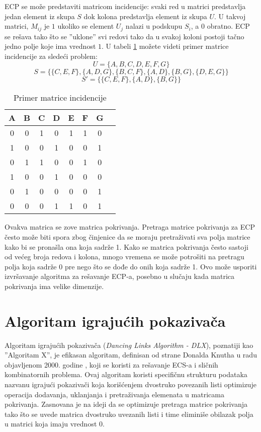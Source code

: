 \documentclass[a4paper]{article}
\begin{document}
{ECP se može predstaviti matricom incidencije: svaki red u matrici predstavlja jedan element iz skupa
\( S \) dok kolona predstavlja element iz skupa \( U \). U takvoj matrici, \( M_{ij} \) je \( 1 \)
ukoliko se element \( U_{j} \) nalazi u podskupu \( S_{i} \), a \( 0 \) obratno. ECP se rešava tako
što se ''uklone'' svi redovi tako da u svakoj koloni postoji tačno jedno polje koje ima vrednost \( 1 \).
U tabeli \ref{tab:incidencije} možete videti primer matrice incidencije za sledeći problem:\\
$$U = \{A, B, C, D, E, F, G\}$$
$$S = \{\{C, E, F\}, \{A, D, G\}, \{B, C, F\}, \{A, D\}, \{B, G\}, \{D, E, G\}\}$$
$$S' = \{\{C, E, F\}, \{A, D\}, \{B, G\}\}$$
\begin{table}[htbp]
  \centering
  \caption{Primer matrice incidencije}
  \label{tab:incidencije}
  \begin{tabular}{|c|*{7}{c|}}
    \hline
    A & B & C & D & E & F & G \\
    \hline
    \rowcolor{green} 0 & 0 & 1 & 0 & 1 & 1 & 0 \\
    1 & 0 & 0 & 1 & 0 & 0 & 1 \\
    0 & 1 & 1 & 0 & 0 & 1 & 0 \\
    \rowcolor{green} 1 & 0 & 0 & 1 & 0 & 0 & 0 \\
    \rowcolor{green} 0 & 1 & 0 & 0 & 0 & 0 & 1 \\
    0 & 0 & 0 & 1 & 1 & 0 & 1 \\
    \hline
  \end{tabular}
\end{table}

Ovakva matrica se zove matrica pokrivanja. Pretraga matrice pokrivanja za ECP često može biti spora zbog
činjenice da se moraju pretraživati sva polja matrice kako bi se pronašla ona koja sadrže 1. Kako se matrica
pokrivanja često sastoji od većeg broja redova i kolona, mnogo vremena se može potrošiti na pretragu polja
koja sadrže 0 pre nego što se dođe do onih koja sadrže 1. Ovo može usporiti izvršavanje algoritma za rešavanje
ECP-a, posebno u slučaju kada matrica pokrivanja ima velike dimenzije.

\section{Algoritam igrajućih pokazivača}

Algoritam igrajućih pokazivača ({\em Dancing Links Algorithm - DLX}), poznatiji kao ''Algoritam X'', je
efikasan algoritam, definisan od strane Donalda Knutha u radu objavljenom 2000. godine \cite{knuth},
koji se koristi za rešavanje ECS-a i sličnih kombinatornih problema. Ovaj algoritam koristi specifičnu
strukturu podataka nazvanu igrajući  pokazivači koja korišćenjem dvostruko povezanih listi optimizuje
operacija dodavanja, uklanjanja i pretraživanja elemenata u matricama pokrivanja. Zasnovana je na ideji
da se optimizuje pretraga matrice pokrivanja tako što se uvede matrica dvostruko uvezanih listi i time
eliminiše obilazak polja u matrici koja imaju vrednost \( 0 \).

}
\end{document}
